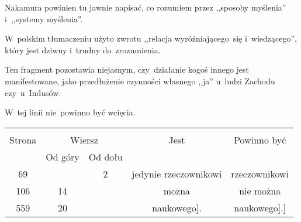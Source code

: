 \documentclass[a4paper,11pt]{article}
\begin{document}
\vspace{\spaceTwo}















\start {} Nakamura powinien tu jawnie napisać, co rozumiem przez
,,sposoby myślenia'' i~,,systemy myślenia''.

\vspace{\spaceFour}


\start {} W~polskim tłumaczeniu użyto zwrotu ,,relacja
wyróżniającego~się i~wiedzącego'', który jest dziwny i~trudny
do~zrozumienia.

\vspace{\spaceFour}


\start {} Ten fragment pozostawia niejasnym,
czy~działanie kogoś innego jest manifestowane, jako przedłużenie
czynności własnego ,,ja'' u~ludzi Zachodu czy~u~Indusów.

\vspace{\spaceFour}


\start {} W~tej linii nie~powinno być wcięcia.


\begin{center}
  \begin{tabular}{|c|c|c|c|c|}
    \hline
    & \multicolumn{2}{c|}{} & & \\
    Strona & \multicolumn{2}{c|}{Wiersz}& Jest & Powinno być \\ \cline{2-3}
    & Od góry & Od dołu &  &  \\ \hline
    69  & &  2 & jedynie rzeczownikowi & rzeczownikowi \\
    106 & 14 & & można & nie można \\
    559 & 20 & & naukowego]. & naukowego].] \\
    \hline
  \end{tabular}
\end{center}
\end{document}
